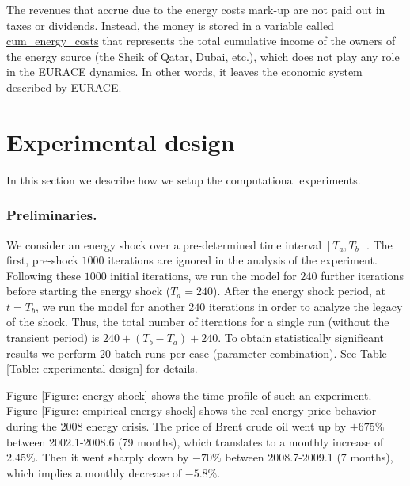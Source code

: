 The revenues that accrue due to the energy costs mark-up are not paid out in
taxes or dividends. Instead, the money is stored in a variable called %
\url{cum_energy_costs} that represents the total cumulative income of the
owners of the energy source (the Sheik of Qatar, Dubai, etc.), which does
not play any role in the EURACE dynamics. In other words, it leaves the
economic system described by EURACE.

\section{Experimental design}

In this section we describe how we setup the computational experiments.

\subsubsection*{Preliminaries.}

\bigskip We consider an energy shock over a pre-determined time interval $%
\left[ T_{a},T_{b}\right]$. The first, pre-shock $1000$ iterations are
ignored in the analysis of the experiment. Following these $1000$ initial
iterations, we run the model for $240$ further iterations before starting
the energy shock ($T_{a}=240$). After the energy shock period, at $t=T_{b}$,
we run the model for another $240$ iterations in order to analyze the legacy
of the shock. Thus, the total number of iterations for a single run (without
the transient period) is $240+(T_{b}-T_{a})+240$. To obtain statistically
significant results we perform $20$ batch runs per case (parameter
combination). See Table \ref{Table: experimental design} for details.

Figure \ref{Figure: energy shock} shows the time profile of such an
experiment. Figure \ref{Figure: empirical energy shock} shows the real
energy price behavior during the 2008 energy crisis. The price of Brent
crude oil went up by $+675\%$ between 2002.1-2008.6 (79 months), which
translates to a monthly increase of $2.45\%$. Then it went sharply down by $%
-70\%$ between 2008.7-2009.1 (7 months), which implies a monthly decrease of 
$-5.8\%$.

